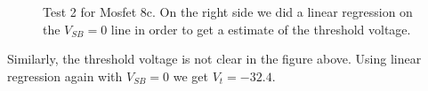 \documentclass{article}
\begin{document}
\begin{figure}[H]
\centering
{}
\caption{Test 2 for Mosfet 8c. On the right side we did a linear regression on the $V_{SB} = 0$ line in order to get a estimate of the threshold voltage.}
\label{fig:8clin}
\end{figure}

Similarly, the threshold voltage is not clear in the figure above. Using linear regression again with $V_{SB} = 0$ we get $V_t = -32.4$.
\end{document}
